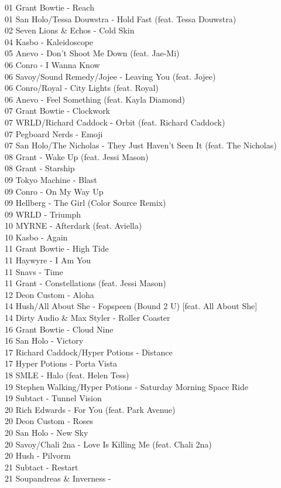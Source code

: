 \begin{multicols}{2}
 01 Grant Bowtie - Reach\\ 01 San Holo/Tessa Douwstra - Hold Fast (feat. Tessa Douwstra)\\ 02 Seven Lions \& Echos - Cold Skin\\ 04 Kasbo - Kaleidoscope\\ 05 Anevo - Don't Shoot Me Down (feat. Jae-Mi)\\ 06 Conro - I Wanna Know\\ 06 Savoy/Sound Remedy/Jojee - Leaving You (feat. Jojee)\\ 06 Conro/Royal - City Lights (feat. Royal)\\ 06 Anevo - Feel Something (feat. Kayla Diamond)\\ 07 Grant Bowtie - Clockwork\\ 07 WRLD/Richard Caddock - Orbit (feat. Richard Caddock)\\ 07 Pegboard Nerds - Emoji\\ 07 San Holo/The Nicholas - They Just Haven't Seen It (feat. The Nicholas)\\ 08 Grant - Wake Up (feat. Jessi Mason)\\ 08 Grant - Starship\\ 09 Tokyo Machine - Blast\\ 09 Conro - On My Way Up\\ 09 Hellberg - The Girl (Color Source Remix)\\ 09 WRLD - Triumph\\ 10 MYRNE - Afterdark (feat. Aviella)\\ 10 Kasbo - Again\\ 11 Grant Bowtie - High Tide\\ 11 Haywyre - I Am You\\ 11 Snavs - Time\\ 11 Grant - Constellations (feat. Jessi Mason)\\ 12 Deon Custom - Aloha\\ 14 Hush/All About She - Fopspeen (Bound 2 U) [feat. All About She]\\ 14 Dirty Audio \& Max Styler - Roller Coaster\\ 16 Grant Bowtie - Cloud Nine\\ 16 San Holo - Victory\\ 17 Richard Caddock/Hyper Potions - Distance\\ 17 Hyper Potions - Porta Vista\\ 18 SMLE - Halo (feat. Helen Tess)\\ 19 Stephen Walking/Hyper Potions - Saturday Morning Space Ride\\ 19 Subtact - Tunnel Vision\\ 20 Rich Edwards - For You (feat. Park Avenue)\\ 20 Deon Custom - Roses\\ 20 San Holo - New Sky\\ 20 Savoy/Chali 2na - Love Is Killing Me (feat. Chali 2na)\\ 20 Hush - Pilvorm\\ 21 Subtact - Restart\\ 21 Soupandreas \& Inverness - 
\end{multicols}
